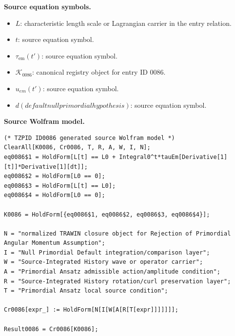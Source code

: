 \begin{minipage}[t]{0.49\linewidth}
\begingroup
\small
\raggedright
\textbf{Source equation symbols.}\par
\begin{itemize}[leftmargin=1.35em,itemsep=1pt,topsep=1pt,parsep=0pt]
    \item $L$: characteristic length scale or Lagrangian carrier in the entry relation.
    \item $t$: source equation symbol.
    \item $\tau_{\mathrm{em}}(t')$: source equation symbol.
    \item $\mathcal{K}_{0086}$: canonical registry object for entry ID 0086.
    \item $u_{em}(t')$: source equation symbol.
    \item $d(defaultnullprimordialhypothesis)$: source equation symbol.
\end{itemize}
\endgroup
\end{minipage}\hfill
\begin{minipage}[t]{0.47\linewidth}
\begingroup
\scriptsize
\raggedright
\textbf{Source Wolfram model.}\par
\begin{Verbatim}[fontsize=\tiny,breaklines=true,breakanywhere=true]
(* TZPID ID0086 generated source Wolfram model *)
ClearAll[K0086, Cr0086, T, R, A, W, I, N];
eq0086$1 = HoldForm[L[t] == L0 + Integral0^t*tauEm[Derivative[1][t]]*Derivative[1][dt]];
eq0086$2 = HoldForm[L0 == 0];
eq0086$3 = HoldForm[L[t] == L0];
eq0086$4 = HoldForm[L0 == 0];

K0086 = HoldForm[{eq0086$1, eq0086$2, eq0086$3, eq0086$4}];

N = "normalized TRAWIN closure object for Rejection of Primordial Angular Momentum Assumption";
I = "Null Primordial Default integration/comparison layer";
W = "Source-Integrated History wave or operator carrier";
A = "Primordial Ansatz admissible action/amplitude condition";
R = "Source-Integrated History rotation/curl preservation layer";
T = "Primordial Ansatz local source condition";

Cr0086[expr_] := HoldForm[N[I[W[A[R[T[expr]]]]]]];

Result0086 = Cr0086[K0086];
\end{Verbatim}
\endgroup
\end{minipage}

